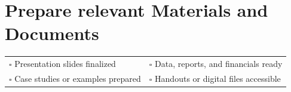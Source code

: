 
\section{Prepare relevant Materials and Documents}
\label{sec:material}

\begin{tabular}{p{9cm} p{8cm}}
$\square$ Presentation slides finalized & $\square$ Data, reports, and financials ready \\ 
$\square$ Case studies or examples prepared & $\square$ Handouts or digital files accessible \\ 
\end{tabular}

